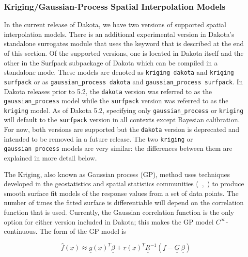 \subsubsection{Kriging/Gaussian-Process Spatial Interpolation Models}
\label{models:surf:kriging}
In the current release of Dakota, we have two versions of supported 
spatial interpolation models. There is an additional experimental
version in Dakota's standalone surrogates module that uses the keyword
 that is described at the end
of this section.
Of the supported versions, one is located in Dakota itself and 
the other in the Surfpack subpackage 
of Dakota which can be compiled in a standalone mode.  These models
are denoted as \texttt{kriging dakota} and \texttt{kriging surfpack} or 
as \texttt{gaussian\_process dakota} and 
\texttt{gaussian\_process surfpack}.  In Dakota releases prior to 5.2, the 
\texttt{dakota} version was referred to as the \texttt{gaussian\_process} 
model while the \texttt{surfpack} version was referred to as the 
\texttt{kriging} model.  As of Dakota 5.2, specifying only
\texttt{gaussian\_process} or \texttt{kriging} will default to the
\texttt{surfpack} version in all contexts except Bayesian calibration.  
For now, both versions are supported but the \texttt{dakota} version is 
deprecated and intended to be removed in a future release.  The two 
\texttt{kriging} or \texttt{gaussian\_process} models are very similar: 
the differences between them are explained in more detail below.

The Kriging, also known as Gaussian process (GP), method uses techniques 
developed in the geostatistics and spatial statistics communities 
(~\cite{Cre91},~\cite{Koe96}) to produce smooth surface fit models of the 
response values from a set of data points.  The number of times the 
fitted surface is differentiable will depend on the correlation function 
that is used.  Currently, the Gaussian correlation function is the only 
option for either version included in Dakota; this makes the GP model 
$C^{\infty}$-continuous.  The form of the GP model is

\begin{equation}
  \hat{f}(\underline{x}) \approx \underline{g}(\underline{x})^T\underline{\beta} +
  \underline{r}(\underline{x})^{T}\underline{\underline{R}}^{-1}(\underline{f}-\underline{\underline{G}}\ \underline{\beta})
  \label{models:surf:equation08}
\end{equation}


